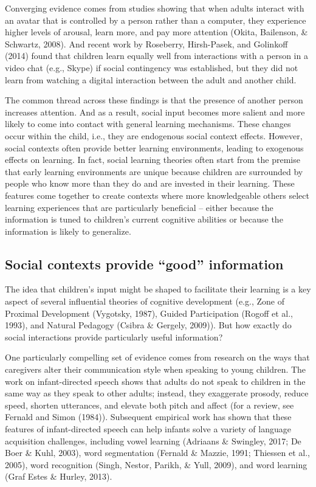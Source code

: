 \documentclass[english,floatsintext,man]{apa6}
\theoremstyle{definition}
\theoremstyle{definition}
\theoremstyle{definition}
\theoremstyle{remark}
\begin{document}
Converging evidence comes from studies showing that when adults interact
with an avatar that is controlled by a person rather than a computer,
they experience higher levels of arousal, learn more, and pay more
attention (Okita, Bailenson, \& Schwartz, 2008). And recent work by
Roseberry, Hirsh-Pasek, and Golinkoff (2014) found that children learn
equally well from interactions with a person in a video chat (e.g.,
Skype) if social contingency was established, but they did not learn
from watching a digital interaction between the adult and another child.

The common thread across these findings is that the presence of another
person increases attention. And as a result, social input becomes more
salient and more likely to come into contact with general learning
mechanisms. These changes occur within the child, i.e., they are
endogenous social context effects. However, social contexts often
provide better learning environments, leading to exogenous effects on
learning. In fact, social learning theories often start from the premise
that early learning environments are unique because children are
surrounded by people who know more than they do and are invested in
their learning. These features come together to create contexts where
more knowledgeable others select learning experiences that are
particularly beneficial -- either because the information is tuned to
children's current cognitive abilities or because the information is
likely to generalize.

\subsection{\texorpdfstring{Social contexts provide \enquote{good}
information}{Social contexts provide good information}}\label{social-contexts-provide-good-information}

The idea that children's input might be shaped to facilitate their
learning is a key aspect of several influential theories of cognitive
development (e.g., Zone of Proximal Development (Vygotsky, 1987), Guided
Participation (Rogoff et al., 1993), and Natural Pedagogy (Csibra \&
Gergely, 2009)). But how exactly do social interactions provide
particularly useful information?

One particularly compelling set of evidence comes from research on the
ways that caregivers alter their communication style when speaking to
young children. The work on infant-directed speech shows that adults do
not speak to children in the same way as they speak to other adults;
instead, they exaggerate prosody, reduce speed, shorten utterances, and
elevate both pitch and affect (for a review, see Fernald and Simon
(1984)). Subsequent empirical work has shown that these features of
infant-directed speech can help infants solve a variety of language
acquisition challenges, including vowel learning (Adriaans \& Swingley,
2017; De Boer \& Kuhl, 2003), word segmentation (Fernald \& Mazzie,
1991; Thiessen et al., 2005), word recognition (Singh, Nestor, Parikh,
\& Yull, 2009), and word learning (Graf Estes \& Hurley, 2013).
\end{document}
